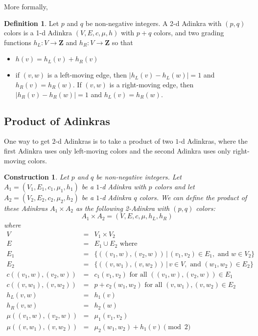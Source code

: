 \documentclass[12pt,twoside,singlespace]{article}
\numberwithin{equation}{section}
\newtheorem{construction}[equation]{Construction}
\theoremstyle{definition}
\newtheorem{definition}[equation]{Definition}
\newcommand{\ZZ}{\mathbf{Z}}
\begin{document}
More formally,
\begin{definition}
Let $p$ and $q$ be non-negative integers.   A 2-d Adinkra with $(p,q)$ colors is a 1-d Adinkra $(V,E,c,\mu,h)$ with $p+q$ colors, and two grading functions $h_L:V\to \ZZ$ and $h_R:V\to \ZZ$ so that
\begin{itemize}
\item $h(v)=h_L(v)+h_R(v)$
\item if $(v,w)$ is a left-moving edge, then $|h_L(v)-h_L(w)|=1$ and $h_R(v)=h_R(w)$.  If $(v,w)$ is a right-moving edge, then $|h_R(v)-h_R(w)|=1$ and $h_L(v)=h_R(w)$.
\end{itemize}
\end{definition}


\subsection{Product of Adinkras}
One way to get $2$-d Adinkras is to take a product of two $1$-d Adinkras, where the first Adinkra uses only left-moving colors and the second Adinkra uses only right-moving colors.

\begin{construction}
\label{const:product}
Let $p$ and $q$ be non-negative integers.  Let $A_1=(V_1, E_1, c_1, \mu_1,h_1)$ be a $1$-d Adinkra with $p$ colors and let $A_2=(V_2, E_2, c_2, \mu_2,h_2)$ be a $1$-d Adinkra $q$ colors.  We can define the product of these Adinkras $A_1\times A_2$ as the following 2-Adinkra with $(p,q)$ colors:
\[A_1\times A_2=(V,E,c,\mu,h_L,h_R)\]
where
\begin{eqnarray*}
V&=&V_1\times V_2\\
E&=&E_1\cup E_2\mbox{ where}\\
E_1&=&\{((v_1,w),(v_2,w))\,|\,(v_1, v_2)\in E_1,\mbox{ and } w\in V_2\}\\
E_2&=&\{((v,w_1),(v,w_2))\,|\,v\in V, \mbox{ and }(w_1,w_2)\in E_2\}\\
c((v_1,w),(v_2,w))&=&c_1(v_1,v_2)\mbox{ for all $((v_1,w),(v_2,w))\in E_1$}\\
c((v,w_1),(v,w_2))&=&p+c_2(w_1,w_2)\mbox{ for all $(v,w_1),(v,w_2)\in E_2$}\\
h_L(v,w)&=&h_1(v)\\
h_R(v,w)&=&h_2(w)\\
\mu((v_1,w),(v_2,w))&=&\mu_1(v_1,v_2)\\
\mu((v,w_1),(v,w_2))&=&\mu_2(w_1,w_2)+h_1(v)\pmod{2}
\end{eqnarray*}
\end{construction}
\end{document}
